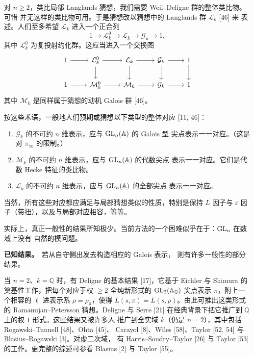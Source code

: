 对 $n\ge2$，类比局部 Langlands 猜想，我们需要 Weil--Deligne 群的整体类比物。可惜
并无这样的类比物可用。于是猜想改以猜想中的 Langlands 群 $\mathcal{L}_k$ [46] 来
表述。人们至多希望 $\mathcal{L}_k$ 进入一个正合列
\[
  1\longrightarrow\mathcal{L}_k^0\longrightarrow\mathcal{L}_k
  \longrightarrow\mathcal{G}_k\longrightarrow 1,
\]
其中 $\mathcal{L}_k^0$ 为复投射约化群。这应当进入一个交换图
\[
\begin{tikzcd}
  1 \arrow[r] & \mathcal{L}_k^0 \arrow[r] \arrow[d]
    & \mathcal{L}_k \arrow[r] \arrow[d]
    & \mathcal{G}_k \arrow[r] \arrow[d] & 1 \arrow[d] \\
  1 \arrow[r] & \mathcal{M}_k^0 \arrow[r]
    & \mathcal{M}_k \arrow[r]
    & \mathcal{G}_k \arrow[r] & 1
\end{tikzcd}
\]
其中 $\mathcal{M}_k$ 是同样属于猜想的动机 Galois 群 [46]。

按这些术语，一般地人们预期或猜想以下类型的整体对应 [11, 46]：
\begin{enumerate}[label=(\roman*),leftmargin=*]
  \item $\mathcal{G}_k$ 的不可约 $n$ 维表示，应与 $\mathrm{GL}_n(\mathbb{A})$ 的 Galois 型
    尖点表示一一对应。（这是对 $\pi_\infty$ 的限制。）
  \item $\mathcal{M}_k$ 的不可约 $n$ 维表示，应与 $\mathrm{GL}_n(\mathbb{A})$ 的代数尖点
    表示一一对应。它们是代数 Hecke 特征的类比物。
  \item $\mathcal{L}_k$ 的不可约 $n$ 维表示，应与 $\mathrm{GL}_n(\mathbb{A})$ 的全部尖点
    表示一一对应。
\end{enumerate}
当然，所有这些对应都应满足与局部猜想类似的性质，特别是保持 $L$ 因子与 $\varepsilon$
因子（带扭），以及与局部对应相容，等等。

实际上，真正一般性的结果所知极少。当前方法的一个困难似乎在于：$\mathrm{GL}_n$ 在数域上没有
自然的模问题。

\par\medskip\noindent\textbf{已知结果。}\ 若从自守侧出发去构造相应的 Galois 表示，
则有许多一般性的部分结果。

当 $n=2$、$k=\mathbb{Q}$ 时，有 Deligne 的基本结果 [17]，它基于 Eichler 与 Shimura
的奠基性工作，把每个对应于权 $\ge2$ 全纯新形式的 $\mathrm{GL}_2(\mathbb{A}_{\mathbb{Q}})$
尖点表示 $\pi$，附上一个相容的 $\ell$ 进表示系 $\rho=\rho_\pi$，使得
$L(s,\pi)=L(s,\rho)$。由此可推出这类形式的 Ramanujan--Petersson 猜想。Deligne 与
Serre [21] 在经典背景下把它推广到 $\mathbb{Q}$ 上的权 $1$ 形式。这些结果又被许多人
推广到全实域 $k$（仍是 $n=2$），其中包括 Rogawski--Tunnell [48]、Ohta [45]、
Carayol [8]、Wiles [58]、Taylor [52, 54] 与 Blasius--Rogawski [3]。对虚二次域，
有 Harris--Soudry--Taylor [26] 与 Taylor [53] 的工作。更完整的综述可参看 Blasius [2]
与 Taylor [55]。


